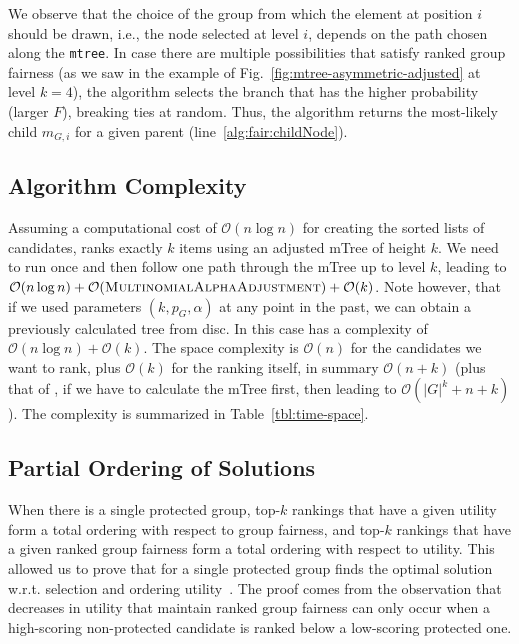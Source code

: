 We observe that the
choice of the group from which the element at position $i$ should be drawn, i.e., the node selected at level $i$, depends on the path chosen along the \texttt{mtree}. %
%
In case there are multiple possibilities that satisfy ranked group fairness (as we saw in the example of Fig.~\ref{fig:mtree-asymmetric-adjusted} at level $k=4$), the algorithm selects the branch that has the higher probability (larger $F$), breaking ties at random.
%
%
Thus, the algorithm returns the most-likely child $m_{G,i}$ for a given parent (line~\ref{alg:fair:childNode}).
%


\subsection{Algorithm Complexity}\label{subsec:FAIR-complexity}
Assuming a computational cost of $\mathcal{O}(n \log{} n)$ for creating the sorted lists of candidates, \algoFAIR ranks exactly $k$ items using an adjusted mTree of height $k$.
%
We need to run \algoMultBinary once and then follow one path through the mTree up to level $k$, leading to $\mathcal{O}(n \log{} n) + \mathcal{O} (\text{{\sc MultinomialAlphaAdjustment}}) + \mathcal{O}(k)$.
%
Note however, that if we used parameters $(k, p_G, \alpha)$ at any point in the past, we can obtain a previously calculated tree from disc.
%
In this case \algoFAIR has a complexity of $\mathcal{O}(n \log{} n) + \mathcal{O}(k)$.
%
The space complexity is $\mathcal{O}(n)$ for the candidates we want to rank, plus $\mathcal{O}(k)$ for the ranking itself, in summary $\mathcal{O}(n + k)$ (plus that of \algoMultBinary, if we have to calculate the mTree first, then leading to $\mathcal{O}(|G|^k + n + k)$).
%
The complexity is summarized in Table~\ref{tbl:time-space}.

\subsection{Partial Ordering of Solutions}
\label{sec:algo:partialOrdering}
When there is a single protected group,
top-$k$ rankings that have a given utility form a total ordering with respect to group fairness, and
top-$k$ rankings that have a given ranked group fairness form a total ordering with respect to utility.
%
This allowed us to prove that \algoFAIR for a single protected group finds the optimal solution w.r.t. selection and ordering utility~\cite{zehlike2017fair}.
%
The proof comes from the observation that decreases in utility that maintain ranked group fairness can only occur when a high-scoring non-protected candidate is ranked below a low-scoring protected one.%
%

